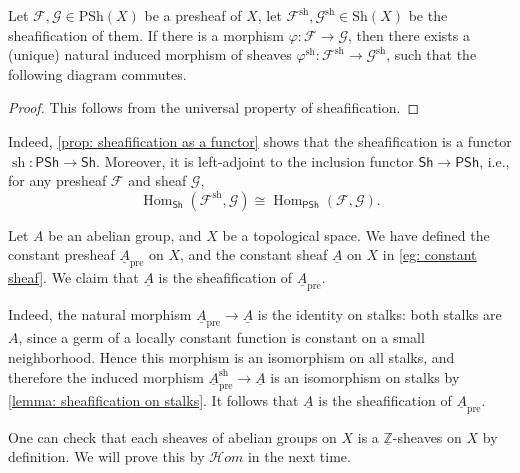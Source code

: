 \documentclass[11pt]{article}
\newcommand{\PSh}{\mathsf{PSh}}
\newcommand{\Sh}{\mathsf{Sh}}
\newcommand{\sh}{\operatorname{sh}}
\newcommand{\Hom}{\operatorname{Hom}}
\begin{document}
\begin{proposition}
    \label{prop: sheafification as a functor}
    \cite[2.4 H]{vakilTheRisingSea}
    Let $\mathscr{F},\mathscr{G} \in \mathrm{PSh}(X)$ be a presheaf of $X$, 
    let $\mathscr{F}^{\mathrm{sh}},\mathscr{G}^{\mathrm{sh}}\in \mathrm{Sh}(X)$ be the sheafification 
    of them. If there is a morphism $\varphi:\mathscr{F} \to \mathscr{G}$, 
    then there exists a (unique) natural induced morphism of sheaves 
    $\varphi^{\mathrm{sh}}: \mathscr{F}^{\mathrm{sh}} \to \mathscr{G}^{\mathrm{sh}}$, 
    such that the following diagram commutes. 
    \begin{center}
    \end{center}
\end{proposition}

\begin{proof}
    This follows from the universal property of sheafification. 
\end{proof}

\begin{remark}
    Indeed, \autoref{prop: sheafification as a functor} shows that the sheafification is a functor 
    $ \sh : \PSh \to \Sh $. Moreover, it is left-adjoint to the inclusion functor $ \Sh \to \PSh $, 
    i.e., for any presheaf $ \mathscr{F} $ and sheaf $ \mathscr{G} $, 
    $$ \Hom_{\Sh}(\mathscr{F}^{\sh},\mathscr{G}) \cong \Hom_{\PSh}(\mathscr{F},\mathscr{G}). $$
\end{remark}

\begin{example}
    Let $ A $ be an abelian group, and $ X $ be a topological space. 
    We have defined the constant presheaf $ \underline{A}_{\operatorname{pre}} $ on $ X $, 
    and the constant sheaf $ \underline{A} $ on $ X $ in \autoref{eg: constant sheaf}. 
    We claim that $ \underline{A} $ is the sheafification of 
    $ \underline{A}_{\operatorname{pre}} $. 
    
    
    Indeed, the natural morphism $ \underline{A}_{\operatorname{pre}} \to \underline{A} $ 
    is the identity on stalks: both stalks are $ A $, since a germ of a 
    locally constant function is constant on a small neighborhood. 
    Hence this morphism is an isomorphism on all stalks, and therefore 
    the induced morphism $ \underline{A}_{\operatorname{pre}}^{\sh} \to \underline{A} $ 
    is an isomorphism on stalks by \autoref{lemma: sheafification on stalks}. 
    It follows that $ \underline{A} $ is the sheafification of 
    $ \underline{A}_{\operatorname{pre}} $. 

    One can check that each sheaves of abelian groups on $ X $ 
    is a $ \underline{\mathbb{Z}} $-sheaves on $ X $ 
    by definition. 
    We will prove this by $ \mathscr{H}om $ in the next time. 
\end{example}
\end{document}

